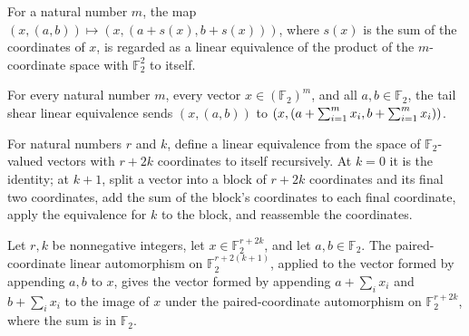 \begin{definition}
\label{FABL.tailShearLinearEquiv}
\leanok
{}
For a natural number $m$, the map $(x,(a,b))\mapsto(x,(a+s(x),b+s(x)))$, where $s(x)$ is
the sum of the coordinates of $x$, is regarded as a linear equivalence of the product of
the $m$-coordinate space with $\mathbb{F}_2^2$ to itself.
\end{definition}

\begin{theorem}
\label{FABL.tailShearLinearEquiv_apply}
\leanok
{}
For every natural number $m$, every vector $x\in(\mathbb{F}_2)^m$, and all
$a,b\in\mathbb{F}_2$, the tail shear linear equivalence sends $(x,(a,b))$ to
$(x,(a+\sum_{i=1}^m x_i,\\ b+\sum_{i=1}^m x_i))$.
\end{theorem}

\begin{definition}
\label{FABL.pairedCoordinateEquiv}
\leanok
{}
For natural numbers $r$ and $k$, define a linear equivalence from the space of
$\mathbb{F}_2$-valued vectors with $r+2k$ coordinates to itself recursively. At $k=0$ it
is the identity; at $k+1$, split a vector into a block of $r+2k$ coordinates and its
final two coordinates, add the sum of the block’s coordinates to each final coordinate,
apply the equivalence for $k$ to the block, and reassemble the coordinates.
\end{definition}

\begin{theorem}
\label{FABL.pairedCoordinateEquiv_succ_appendTwo}
\leanok
{}
Let $r,k$ be nonnegative integers, let $x\in\mathbb{F}_2^{r+2k}$, and let
$a,b\in\mathbb{F}_2$. The paired-coordinate linear automorphism on
$\mathbb{F}_2^{r+2(k+1)}$, applied to the vector formed by appending $a,b$ to $x$, gives
the vector formed by appending $a+\sum_i x_i$ and $b+\sum_i x_i$ to the image of $x$
under the paired-coordinate automorphism on $\mathbb{F}_2^{r+2k}$, where the sum is in
$\mathbb{F}_2$.
\end{theorem}

